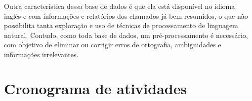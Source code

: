 Outra característica dessa base de dados é que ela está disponível no idioma inglês e com informações e relatórios dos chamados já bem resumidos, o que não possibilita tanta exploração e uso de técnicas de processamento de linguagem natural. Contudo, como toda base de dados, um pré-processamento é necessário, com objetivo de eliminar ou corrigir erros de ortografia, ambiguidades e informações irrelevantes.
\section{Cronograma de atividades}